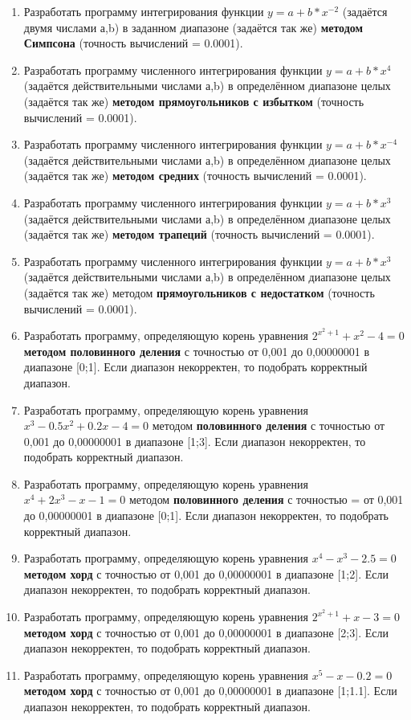 \documentclass[a4paper, 12pt, oneside]{article}
\begin{document}
\begin{enumerate}
    \item Разработать программу интегрирования функции $y=a+b*x^{-2}$ (задаётся двумя числами а,b) в заданном диапазоне (задаётся так же) \textbf{методом Симпсона} (точность вычислений = 0.0001).
    \item Разработать программу численного интегрирования функции $y=a+b*x^4$ (задаётся действительными числами а,b) в определённом диапазоне целых (задаётся так же) \textbf{методом прямоугольников с избытком} (точность вычислений = 0.0001).
    \item Разработать программу численного интегрирования функции $y=a+b*x^{-4}$ (задаётся действительными числами а,b) в определённом диапазоне целых (задаётся так же) \textbf{методом средних} (точность вычислений = 0.0001).
    \item Разработать программу численного интегрирования функции $y=a+b*x^3$ (задаётся действительными числами а,b) в определённом диапазоне целых (задаётся так же) \textbf{методом трапеций} (точность вычислений = 0.0001).
    \item Разработать программу численного интегрирования функции $y=a+b*x^3$ (задаётся действительными числами а,b) в определённом диапазоне целых (задаётся так же) методом \textbf{прямоугольников с недостатком} (точность вычислений = 0.0001).
    \item Разработать программу, определяющую корень уравнения $2^{x^{2}+1}+x^2-4=0$ \textbf{методом половинного деления} с точностью от 0,001 до 0,00000001 в диапазоне [0;1]. Если диапазон некорректен, то подобрать корректный диапазон.
    \item Разработать программу, определяющую корень уравнения $x^3-0.5x^2+0.2x-4=0$ методом \textbf{половинного деления} с точностью  от 0,001 до 0,00000001 в диапазоне [1;3]. Если диапазон некорректен, то подобрать корректный диапазон.
    \item Разработать программу, определяющую корень уравнения $x^4+2x^3-x-1=0$ методом \textbf{половинного деления} с точностью = от 0,001 до 0,00000001 в диапазоне [0;1]. Если диапазон некорректен, то подобрать корректный диапазон.
    \item Разработать программу, определяющую корень уравнения $x^4-x^3-2.5=0$ \textbf{методом хорд} с точностью от 0,001 до 0,00000001 в диапазоне [1;2]. Если диапазон некорректен, то подобрать корректный диапазон.
    \item Разработать программу, определяющую корень уравнения $2^{x^{2}+1}+x-3=0$ \textbf{методом хорд} с точностью от 0,001 до 0,00000001 в диапазоне [2;3]. Если диапазон некорректен, то подобрать корректный диапазон.
    \item Разработать программу, определяющую корень уравнения $x^5-x-0.2=0$ \textbf{методом хорд} с точностью от 0,001 до 0,00000001 в диапазоне [1;1.1]. Если диапазон некорректен, то подобрать корректный диапазон.
\end{enumerate}
\end{document}
